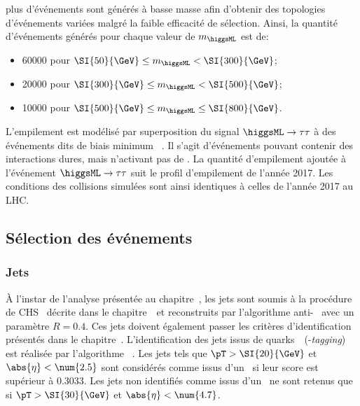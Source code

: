 plus d'événements sont générés à basse masse afin d'obtenir des topologies d'événements variées malgré la faible efficacité de sélection.
Ainsi, la quantité d'événements générés pour chaque valeur de $m_{\higgsML}$ est de:
\begin{itemize}
\item \num{60000} pour $ \SI{50}{\GeV} \leq m_{\higgsML} < \SI{300}{\GeV} $;
\item \num{20000} pour $ \SI{300}{\GeV} \leq m_{\higgsML} < \SI{500}{\GeV} $;
\item \num{10000} pour $ \SI{500}{\GeV} \leq m_{\higgsML} \leq \SI{800}{\GeV}$.
\end{itemize}
\par
L'empilement est modélisé par superposition du signal $\higgsML\to\tau\tau$ à des événements dits de \og biais minimum \fg~\cite{pythia8.2}.
Il s'agit d'événements pouvant contenir des interactions dures, mais n'activant pas de \HLTpath.
La quantité d'empilement ajoutée à l'événement $\higgsML\to\tau\tau$ suit le profil d'empilement de l'année 2017.
Les conditions des collisions simulées sont ainsi identiques à celles de l'année 2017 au LHC.
\subsection{Sélection des événements}\label{chapter-ML-section-evt_gen-selection}
\subsubsection{Jets}
À l'instar de l'analyse présentée au chapitre~,
les jets sont
soumis à la procédure de CHS~\cite{CMS-PAS-JME-14-001} décrite dans le chapitre~\
et
reconstruits par l'algorithme anti-\kT~\cite{Cacciari_antikT} avec un paramètre $R=\num{0.4}$.
Ces jets doivent également passer les critères d'identification présentés dans le chapitre~.
L'identification des jets issus de quarks~\quarkb\ (\quarkb-\emph{tagging}) est réalisée par l'algorithme \DeepCSV~\cite{Sirunyan_heavy_flavor_jets_2018,DeepJet}.
Les jets tels que $\pT > \SI{20}{\GeV}$ et $\abs{\eta}<\num{2.5}$ sont considérés comme issus d'un \quarkb\ si leur score est supérieur à \num{0.3033}.
Les jets non identifiés comme issus d'un \quarkb\ ne sont retenus que si $\pT > \SI{30}{\GeV}$ et $\abs{\eta}<\num{4.7}$.
